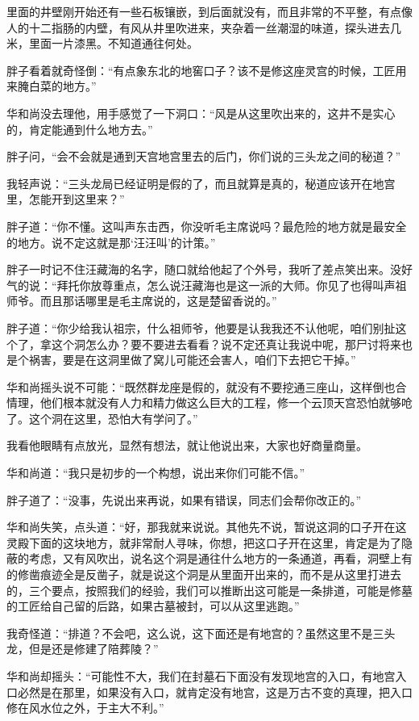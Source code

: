 里面的井壁刚开始还有一些石板镶嵌，到后面就没有，而且非常的不平整，有点像人的十二指肠的内壁，有风从井里吹进来，夹杂着一丝潮湿的味道，探头进去几米，里面一片漆黑。不知道通往何处。

胖子看着就奇怪倒：“有点象东北的地窖口子？该不是修这座灵宫的时候，工匠用来腌白菜的地方。”

华和尚没去理他，用手感觉了一下洞口：“风是从这里吹出来的，这井不是实心的，肯定能通到什么地方去。”

胖子问，“会不会就是通到天宫地宫里去的后门，你们说的三头龙之间的秘道？”

我轻声说：“三头龙局已经证明是假的了，而且就算是真的，秘道应该开在地宫里，怎能开到这里来？”

胖子道：“你不懂。这叫声东击西，你没听毛主席说吗？最危险的地方就是最安全的地方。说不定这就是那‘汪汪叫’的计策。”

胖子一时记不住汪藏海的名字，随口就给他起了个外号，我听了差点笑出来。没好气的说：“拜托你放尊重点，怎么说汪藏海也是这一派的大师。你见了也得叫声祖师爷。而且那话哪里是毛主席说的，这是楚留香说的。”

胖子道：“你少给我认祖宗，什么祖师爷，他要是认我我还不认他呢，咱们别扯这个了，拿这个洞怎么办？要不要进去看看？说不定还真让我说中呢，那尸讨将来也是个祸害，要是在这洞里做了窝儿可能还会害人，咱们下去把它干掉。”

华和尚摇头说不可能：“既然群龙座是假的，就没有不要挖通三座山，这样倒也合情理，他们根本就没有人力和精力做这么巨大的工程，修一个云顶天宫恐怕就够呛了。这个洞在这里，恐怕大有学问了。”

我看他眼睛有点放光，显然有想法，就让他说出来，大家也好商量商量。

华和尚道：“我只是初步的一个构想，说出来你们可能不信。”

胖子道了：“没事，先说出来再说，如果有错误，同志们会帮你改正的。”

华和尚失笑，点头道：“好，那我就来说说。其他先不说，暂说这洞的口子开在这灵殿下面的这块地方，就非常耐人寻味，你想，把这口子开在这里，肯定是为了隐蔽的考虑，又有风吹出，说名这个洞是通往什么地方的一条通道，再看，洞壁上有的修凿痕迹全是反凿子，就是说这个洞是从里面开出来的，而不是从这里打进去的，三个要点，按照我们的经验，我们可以推断出这可能是一条排道，可能是修墓的工匠给自己留的后路，如果古墓被封，可以从这里逃跑。”

我奇怪道：“排道？不会吧，这么说，这下面还是有地宫的？虽然这里不是三头龙，但是还是修建了陪葬陵？”

华和尚却摇头：“可能性不大，我们在封墓石下面没有发现地宫的入口，有地宫入口必然是在那里，如果没有入口，就肯定没有地宫，这是万古不变的真理，把入口修在风水位之外，于主大不利。”


